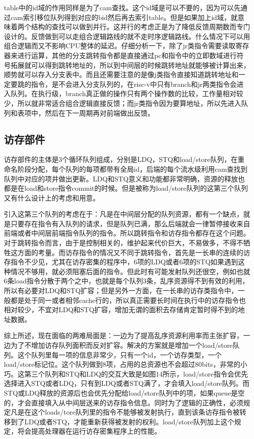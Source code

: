 \documentclass[11pt]{article}
\begin{document}
table中的id域的作用同样是为了cam查找。这个id域是可以不要的，因为可以先通过cam索引移位队列得到对应的bid然后再去索引table。但是如果加上id域，就意味着两个结构的查找可以做到并行。这并行的考虑正是为了降低反馈周期数而专门设计的。反馈做到可以走组合逻辑路线的就不走时序逻辑路线。什么情况下可以用组合逻辑而又不影响CPU整体的延迟。仔细分析一下，除了jr类指令需要读取寄存器来进行运算，其他的分支跳转指令都是直接通过pc和指令中的立即数域进行符号拓展就可以得到跳转地址的，所以到中间层的时候跳转地址就能够被计算出来，顺势就可以存入分支表中。而且还需要注意的是像j类指令直接知道跳转地址和一定要跳的指令，是不会进入分支队列的，在risc-v中只有branch和jr两类指令会进入队列。在执行级，branch真正做的操作只有两个操作数的比较，工作量相对较少，所以就非常适合组合逻辑直接反馈；而jr类指令因为要算地址，所以先进入队列和表项中，然后在下一周期再对前端做出反馈。
\subsection{访存部件}
访存部件的主体是3个循环队列组成，分别是LDQ，STQ和load/store队列，在重命名阶段分配，每个队列的每项都带有全局id，后端的每个流水级利用cam查找到队列中对应的项并做出更新。LDQ和STQ意义和功能都非常明确，资源的释放也都是在load和store指令commit的时候。但是被称为load/store队列的这第三个队列又有什么设计上的考虑和用意。

引入这第三个队列的考虑在于：凡是在中间层分配的队列资源，都有一个缺点，就是只要存在指令有入队列的请求，但是队列已满，那么后端就会一律暂停接收来自前端或者中间层前端指令队列的指令。所以跳转指令和访存指令都存在这个问题。对于跳转指令而言，由于是控制相关的，维护起来代价巨大，不易做多，不得不牺牲这方面的考量。而访存指令的情况又不同于跳转指令，首先是一长串的连续的访存指令不少见，尤其在访存密集的程序中，6项的LDQ或者6项的STQ如果遇到这种情况不够用，就必须阻塞后面的指令。但此时有可能发射队列还很空，例如也就6条load指令分散于两个之中，也就是每个队列3条，乱序资源得不到有效的利用，所以有必要对LDQ和STQ扩容；但是另外一方面，在一长串的访存类指令中，一般都是处于同一或者相邻cache行的，所以真正需要长时间在执行中的访存指令也相对较少，不宜对LDQ和STQ扩容，增加无谓的面积去存储肯定暂时得不到的地址数据。

综上所述，现在面临的两难局面是：一边为了提高乱序资源利用率而主张扩容，一边为了不增加访存队列面积而反对扩容。解决的方案就是增加一个load/store队列。这个队列里每一项的信息非常少，只有一个id，一个访存类型，一个load/store标记位。这个队列做到8项，占用的总资源也不会超过80bits，非常的小巧。这第三个队列和STQ和LDQ的交互大致是如图14所示，load/store指令会优先选择进入STQ或者LDQ，只有到LDQ或者STQ满了，才会填入load/store队列。而STQ或LDQ释放的资源后也会优先分配给load/store队列中的项，如果queue是空的，才会直接填入从中间层送来的访存指令信息。同时为了逻辑的正确性，必须规定凡是在这个loads/tore队列里的指令不能够被发射执行，直到该条访存指令被转移到了LDQ或者STQ，才能重新获得被发射的权利。load/store队列加上这个规定，将会提高处理器在运行访存密集程序上的性能。
\end{document}
